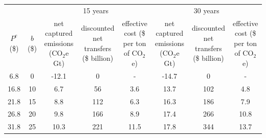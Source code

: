 \begin{tabular}{cccccccc}
\toprule
&& \multicolumn{3}{c}{15 years} & \multicolumn{3}{c}{30 years} \\
\cmidrule[1pt](r){3-5} \cmidrule[1pt](r){6-8}
\makecell[c]{$P^e$ \\ (\$)} & \makecell[c]{$b$ \\ (\$)} & \makecell[c]{net captured \\ emissions \\ (CO$_2$e Gt)} & \makecell[c]{discounted \\ net transfers \\  (\$ billion)} & \makecell[c]{  effective cost \\ (\$ per ton \\ of CO$_2$e)} & \makecell[c]{net captured \\ emissions \\ (CO$_2$e Gt)} & \makecell[c]{discounted \\ net transfers \\ (\$ billion)} & \makecell[c]{  effective cost \\ (\$ per ton \\ of CO$_2$e)} \\
\midrule

6.8 & 0 & -12.1 & 0 & - & -14.7 & 0 & - \\
16.8 & 10 & 6.7 & 56 & 3.6 & 13.7 & 102 & 4.8 \\
21.8 & 15 & 8.8 & 112 & 6.3 & 16.3 & 186 & 7.9 \\
26.8 & 20 & 9.8 & 166 & 8.9 & 17.4 & 266 & 10.8 \\
31.8 & 25 & 10.3 & 221 & 11.5 & 17.8 & 344 & 13.7 \\
\bottomrule
\end{tabular}
